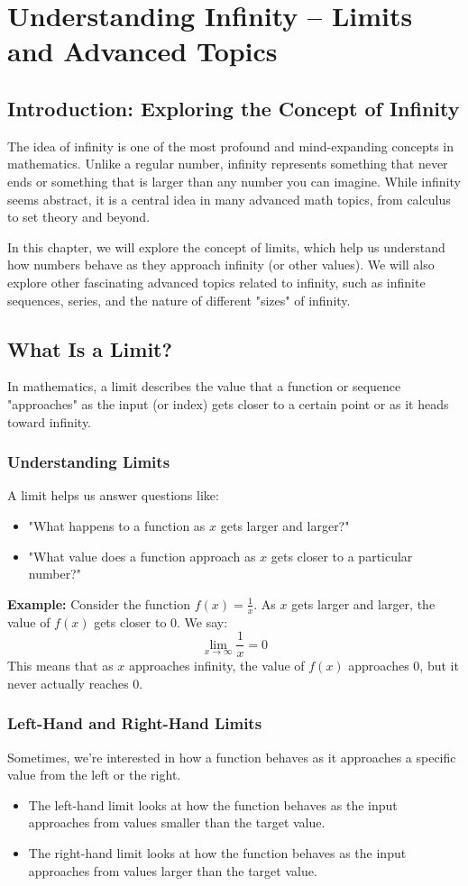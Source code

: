 
\chapter{Understanding Infinity – Limits and Advanced Topics}

\section{Introduction: Exploring the Concept of Infinity}
The idea of infinity is one of the most profound and mind-expanding concepts in mathematics. Unlike a regular number, infinity represents something that never ends or something that is larger than any number you can imagine. While infinity seems abstract, it is a central idea in many advanced math topics, from calculus to set theory and beyond.

In this chapter, we will explore the concept of limits, which help us understand how numbers behave as they approach infinity (or other values). We will also explore other fascinating advanced topics related to infinity, such as infinite sequences, series, and the nature of different "sizes" of infinity.

\section{What Is a Limit?}
In mathematics, a limit describes the value that a function or sequence "approaches" as the input (or index) gets closer to a certain point or as it heads toward infinity.

\subsection{Understanding Limits}
A limit helps us answer questions like:
\begin{itemize}
    \item "What happens to a function as $x$ gets larger and larger?"
    \item "What value does a function approach as $x$ gets closer to a particular number?"
\end{itemize}

\textbf{Example:} Consider the function $f(x) = \frac{1}{x}$. As $x$ gets larger and larger, the value of $f(x)$ gets closer to 0. We say:
\[
\lim_{x \to \infty} \frac{1}{x} = 0
\]
This means that as $x$ approaches infinity, the value of $f(x)$ approaches 0, but it never actually reaches 0.

\subsection{Left-Hand and Right-Hand Limits}
Sometimes, we’re interested in how a function behaves as it approaches a specific value from the left or the right.
\begin{itemize}
    \item The left-hand limit looks at how the function behaves as the input approaches from values smaller than the target value.
    \item The right-hand limit looks at how the function behaves as the input approaches from values larger than the target value.
\end{itemize}

